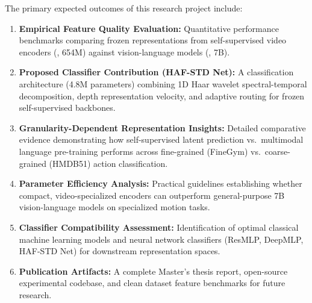 The primary expected outcomes of this research project include:
\begin{enumerate}[leftmargin=*]
    \item \textbf{Empirical Feature Quality Evaluation:} Quantitative performance benchmarks comparing frozen representations from self-supervised video encoders (\vjepaa{}, 654M) against vision-language models (\qwenvl{}, 7B).
    \item \textbf{Proposed Classifier Contribution (HAF-STD Net):} A classification architecture (4.8M parameters) combining 1D Haar wavelet spectral-temporal decomposition, depth representation velocity, and adaptive routing for frozen self-supervised backbones.
    \item \textbf{Granularity-Dependent Representation Insights:} Detailed comparative evidence demonstrating how self-supervised latent prediction vs.\ multimodal language pre-training performs across fine-grained (FineGym) vs.\ coarse-grained (HMDB51) action classification.
    \item \textbf{Parameter Efficiency Analysis:} Practical guidelines establishing whether compact, video-specialized encoders can outperform general-purpose 7B vision-language models on specialized motion tasks.
    \item \textbf{Classifier Compatibility Assessment:} Identification of optimal classical machine learning models and neural network classifiers (ResMLP, DeepMLP, HAF-STD Net) for downstream representation spaces.
    \item \textbf{Publication Artifacts:} A complete Master's thesis report, open-source experimental codebase, and clean dataset feature benchmarks for future research.
\end{enumerate}

